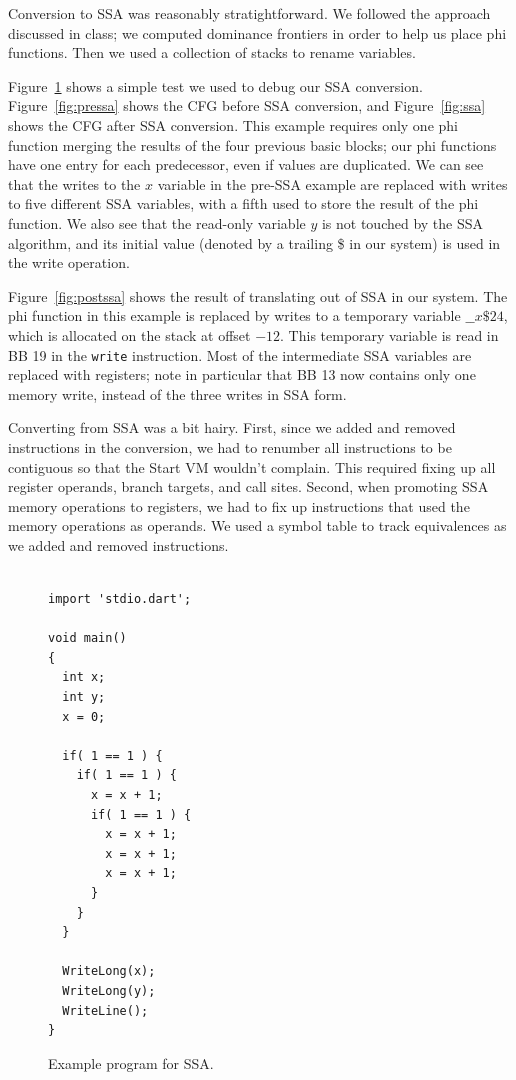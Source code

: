\documentclass[10pt,twocolumn]{article}
\begin{document}
Conversion to SSA was reasonably stratightforward. We followed the
approach discussed in class; we computed dominance frontiers in order
to help us place phi functions. Then we used a collection of stacks to
rename variables.

Figure~\ref{fig:ssa-code} shows a simple test we used to debug our SSA
conversion. Figure~\ref{fig:pressa} shows the CFG before SSA
conversion, and Figure~\ref{fig:ssa} shows the CFG after SSA
conversion. This example requires only one phi function merging the
results of the four previous basic blocks; our phi functions have one
entry for each predecessor, even if values are duplicated. We can see
that the writes to the $x$ variable in the pre-SSA example are
replaced with writes to five different SSA variables, with a fifth
used to store the result of the phi function. We also see that the
read-only variable $y$ is not touched by the SSA algorithm, and its
initial value (denoted by a trailing \$ in our system) is used in the
write operation.

Figure~\ref{fig:postssa} shows the result of translating out of SSA in
our system. The phi function in this example is replaced by writes to
a temporary variable $\_\_x\$24$, which is allocated on the stack at
offset $-12$. This temporary variable is read in BB 19 in the
\texttt{write} instruction. Most of the intermediate SSA variables are
replaced with registers; note in particular that BB 13 now contains
only one memory write, instead of the three writes in SSA form.

Converting from SSA was a bit hairy. First, since we added and removed
instructions in the conversion, we had to renumber all instructions to
be contiguous so that the Start VM wouldn't complain. This required
fixing up all register operands, branch targets, and call
sites. Second, when promoting SSA memory operations to registers, we
had to fix up instructions that used the memory operations as
operands. We used a symbol table to track equivalences as we added and
removed instructions.

\begin{figure}
\begin{center}
  \begin{verbatim}

import 'stdio.dart';

void main()
{
  int x;
  int y;
  x = 0;

  if( 1 == 1 ) {
    if( 1 == 1 ) {
      x = x + 1;
      if( 1 == 1 ) {
        x = x + 1;
        x = x + 1;
        x = x + 1;
      }
    }
  }

  WriteLong(x);
  WriteLong(y);
  WriteLine();
}

\end{verbatim}
\begin{minipage}{0.95\columnwidth}
  \caption{\label{fig:ssa-code} Example program for SSA.}
\end{minipage}
\end{center}
\end{figure}
\end{document}
